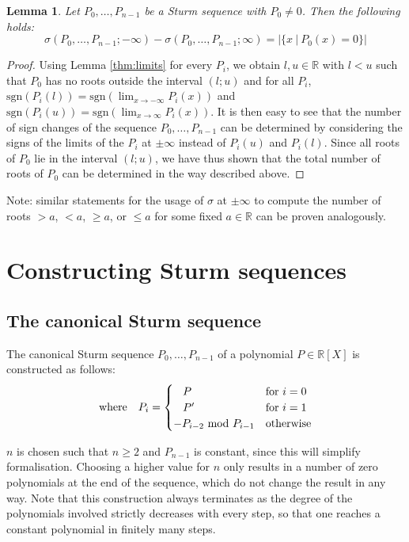 \documentclass[11pt,a4paper,oneside]{article}
\newtheorem{lemma}[definition]{Lemma}
\newcommand{\RR}{\mathbb{R}}
\newcommand{\sgn}{\mathrm{sgn}}
\begin{document}
\begin{lemma}\label{thm:count_roots}
Let $P_0,\ldots,P_{n-1}$ be a Sturm sequence with $P_0\neq 0$. Then the following holds: $$\sigma(P_0,\ldots,P_{n-1}; -\infty)-\sigma(P_0,\ldots,P_{n-1}; \infty) = |\{x\ |\ P_0(x)=0\}|$$
\end{lemma}
\begin{proof}
Using Lemma \ref{thm:limits} for every $P_i$, we obtain $l,u\in\RR$ with $l<u$ such that $P_0$ has no roots outside the interval $(l;u)$ and for all $P_i$, $\sgn(P_i(l))=\sgn(\lim_{x\to -\infty} P_i(x))$ and $\sgn(P_i(u))=\sgn(\lim_{x\to \infty} P_i(x))$. It is then easy to see that the number of sign changes of the sequence $P_0,\ldots,P_{n-1}$ can be determined by considering the signs of the limits of the $P_i$ at $\pm\infty$ instead of $P_i(u)$ and $P_i(l)$. Since all roots of $P_0$ lie in the interval $(l;u)$, we have thus shown that the total number of roots of $P_0$ can be determined in the way described above.
\end{proof}

Note: similar statements for the usage of $\sigma$ at $\pm\infty$ to compute the number of roots $>a$, $<a$, $\geq a$, or $\leq a$ for some fixed $a\in\RR$ can be proven analogously.

\newpage
\section{Constructing Sturm sequences}
\label{sec:construction}
\subsection{The canonical Sturm sequence}

The canonical Sturm sequence $P_0,\ldots,P_{n-1}$ of a polynomial $P\in\RR[X]$ is constructed as follows:
\begin{align*}
&&\mathrm{where}\quad &P_i = \begin{cases}
\hskip3mm P & \mathrm{for}\ i = 0\\
\hskip3mm P' & \mathrm{for}\ i = 1\\
-P_{i-2}\ \mathrm{mod}\ P_{i-1} &\mathrm{otherwise}
\end{cases}&
\end{align*}

$n$ is chosen such that $n\geq 2$ and $P_{n-1}$ is constant, since this will simplify formalisation. Choosing a higher value for $n$ only results in a number of zero polynomials at the end of the sequence, which do not change the result in any way. Note that this construction always terminates as the degree of the polynomials involved strictly decreases with every step, so that one reaches a constant polynomial in finitely many steps.\\
\end{document}
